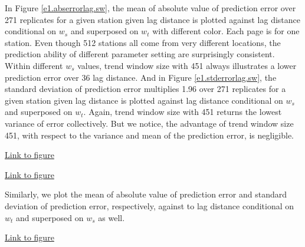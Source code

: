 In Figure \href{../plots/tmax.absmeans.vs.lag.sw.pdf}{\ref*{e1.abserrorlag.sw}}, 
the mean of absolute value of prediction error over 271 replicates for a given
station given lag distance is plotted against lag distance conditional on $w_s$ 
and superposed on $w_t$ with different color. Each page is for one station. Even
though 512 stations all come from very different locations, the prediction ability
of different parameter setting are surprisingly consistent. Within different 
$w_s$ values, trend window size with 451 always illustrates a lower prediction
error over 36 lag distance.
And in Figure \href{../plots/tmax.std.vs.lag.sw.pdf}{\ref*{e1.stderrorlag.sw}},
the standard deviation of prediction error multiplies 1.96 over 271 replicates 
for a given 
station given lag distance is plotted against lag distance conditional on $w_s$
and superposed on $w_t$. Again, trend window size with 451 returns the lowest
variance of error collectively. 
But we notice, the advantage of trend window size 451, with respect to the 
variance and mean of the prediction error, is negligible. 

\begin{framed}
\begin{center}
  \href{../plots/a1950/E1/tmax.absmeans.vs.lag.sw.pdf}{Link to figure}
  \label{e1.abserrorlag.sw}
\end{center}
\end{framed}

\begin{framed}
\begin{center}
  \href{../plots/a1950/E1/tmax.std.vs.lag.sw.pdf}{Link to figure}
  \label{e1.stderrorlag.sw}
\end{center}
\end{framed}

Similarly, we plot the mean of absolute value of prediction error and standard 
deviation of prediction error, respectively, against to lag distance conditional 
on $w_t$ and superposed on $w_s$ as well.

\begin{framed}
\begin{center}
  \href{../plots/a1950/E1/tmax.absmeans.vs.lag.tw.pdf}{Link to figure}
  \label{e1.abserrorlag.tw}
\end{center}
\end{framed}

